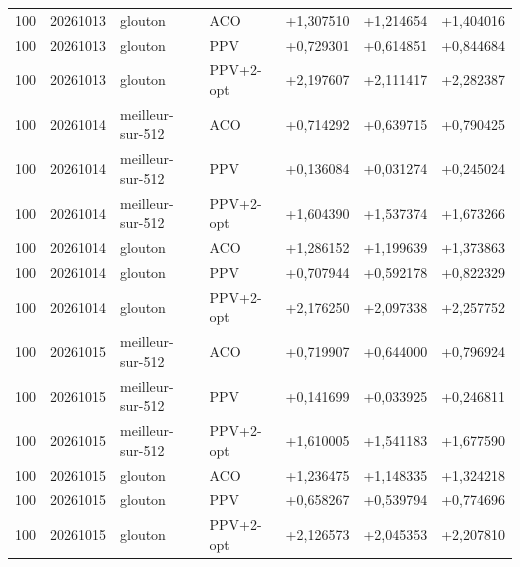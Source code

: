 \documentclass[12pt, a4paper, twoside, openright]{book}
\begin{document}
\begin{longtable}{r r l l r r r}
100 & 20261013 & glouton & ACO & +1,307510 & +1,214654 & +1,404016 \\
100 & 20261013 & glouton & PPV & +0,729301 & +0,614851 & +0,844684 \\
100 & 20261013 & glouton & PPV+2-opt & +2,197607 & +2,111417 & +2,282387 \\
100 & 20261014 & meilleur-sur-512 & ACO & +0,714292 & +0,639715 & +0,790425 \\
100 & 20261014 & meilleur-sur-512 & PPV & +0,136084 & +0,031274 & +0,245024 \\
100 & 20261014 & meilleur-sur-512 & PPV+2-opt & +1,604390 & +1,537374 & +1,673266 \\
100 & 20261014 & glouton & ACO & +1,286152 & +1,199639 & +1,373863 \\
100 & 20261014 & glouton & PPV & +0,707944 & +0,592178 & +0,822329 \\
100 & 20261014 & glouton & PPV+2-opt & +2,176250 & +2,097338 & +2,257752 \\
100 & 20261015 & meilleur-sur-512 & ACO & +0,719907 & +0,644000 & +0,796924 \\
100 & 20261015 & meilleur-sur-512 & PPV & +0,141699 & +0,033925 & +0,246811 \\
100 & 20261015 & meilleur-sur-512 & PPV+2-opt & +1,610005 & +1,541183 & +1,677590 \\
100 & 20261015 & glouton & ACO & +1,236475 & +1,148335 & +1,324218 \\
100 & 20261015 & glouton & PPV & +0,658267 & +0,539794 & +0,774696 \\
100 & 20261015 & glouton & PPV+2-opt & +2,126573 & +2,045353 & +2,207810 \\
\end{longtable}
\normalsize

	\cleardoublepage
	\nocite{*}
	
	
\end{document}

